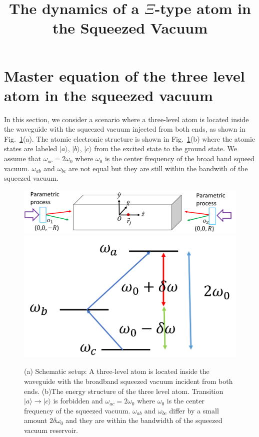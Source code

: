 \documentclass[aps,showpacs,onecolumn,twoside,groupedaddress]{revtex4}
\begin{document}
\title{The dynamics of a $\Xi$-type atom in the Squeezed Vacuum}
\maketitle 



\section{Master equation of the three level atom in the squeezed vacuum}
In this section, we consider a scenario where a three-level atom is located inside the waveguide with the squeezed vacuum injected from both ends, as shown in Fig.~\ref{1}(a). The atomic electronic structure is shown in Fig.~\ref{1}(b) where the atomic states are labeled $|a\rangle$, $|b\rangle$, $|c\rangle$ from the excited state to the ground state. We assume that $\omega_{ac}=2\omega_0$ where $\omega_0$ is the center frequency of the broad band squeed vacuum. $\omega_{ab}$ and $\omega_{bc}$ are not equal but they are still within the bandwith of the squeezed vacuum.  
\begin{figure}
\includegraphics[width=0.7\columnwidth]{fig1.png}
\includegraphics[width=0.25\columnwidth]{fig2.png}
\caption{(a) Schematic setup: A three-level atom is located inside the waveguide with the broadband squeezed vacuum incident from both ends. (b)The energy structure of the three level atom. Transition $|a\rangle\rightarrow|c\rangle$ is forbidden and $\omega_{ac}=2\omega_0$ where $\omega_0$ is the center frequency of the squeezed vacuum. $\omega_{ab}$ and $\omega_{bc}$ differ by a small amount $2\delta\omega_0$ and they are within the bandwidth of the squeezed vacuum reservoir.}
\label{1}
\end{figure}
\end{document}
